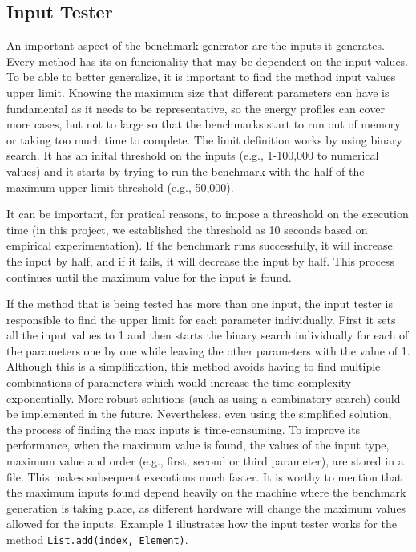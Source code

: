 \subsection{Input Tester} \label{sec:work_stage1_input_tester}

An important aspect of the benchmark generator are the inputs it generates. Every method has its on funcionality that may be dependent on the input values. To be able to better generalize, it is important to find the method input values upper limit. Knowing the maximum size that different parameters can have is fundamental as it needs to be representative, so the energy profiles can cover more cases, but not to large so that the benchmarks start to run out of memory or taking too much time to complete.
The limit definition works by using binary search. It has an inital threshold on the inputs (e.g., 1-100,000 to numerical values) and it starts by trying to run the benchmark with the half of the maximum upper limit threshold (e.g., 50,000). 

It can be important, for pratical reasons, to impose a threashold on the execution time (in this project, we established the threshold as 10 seconds based on empirical experimentation). If the benchmark runs successfully, it will increase the input by half, and if it fails, it will decrease the input by half. This process continues until the maximum value for the input is found.

If the method that is being tested has more than one input, the input tester is responsible to find the upper limit for each parameter individually. First it sets all the input values to 1 and then starts the binary search individually for each of the parameters one by one while leaving the other parameters with the value of 1. Although this is a simplification, this method avoids having to find multiple combinations of parameters which would increase the time complexity exponentially. More robust solutions (such as using a combinatory search) could be implemented in the future. Nevertheless, even using the simplified solution, the process of finding the max inputs is time-consuming. To improve its performance, when the maximum value is found, the values of the input type, maximum value and order (e.g., first, second or third parameter), are stored in a file. This makes subsequent executions much faster. It is worthy to mention that the maximum inputs found depend heavily on the machine where the benchmark generation is taking place, as different hardware will change the maximum values allowed for the inputs. Example 1 illustrates how the input tester works for the method \texttt{List.add(index, Element)}.

